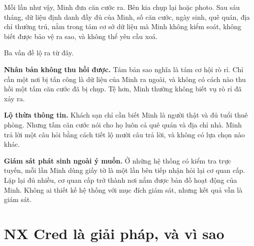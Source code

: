 \documentclass[a4paper,11pt,oneside]{report}
\theoremstyle{definition}
\theoremstyle{plain}
\begin{document}
Mỗi lần như vậy, Minh đưa căn cước ra. Bên kia chụp lại hoặc photo. Sau sáu tháng, dữ liệu định
danh đầy đủ của Minh, số căn cước, ngày sinh, quê quán, địa chỉ thường trú, nằm trong tám
cơ sở dữ liệu mà Minh không kiểm soát, không biết được bảo vệ ra sao, và không thể yêu cầu xoá.

\begin{center}
\end{center}

Ba vấn đề lộ ra từ đây.

\textbf{Nhân bản không thu hồi được.} Tám bản sao nghĩa là tám cơ hội rò rỉ. Chỉ cần một nơi bị
tấn công là dữ liệu của Minh ra ngoài, và không có cách nào thu hồi một tấm căn cước đã bị chụp.
Tệ hơn, Minh thường không biết vụ rò rỉ đã xảy ra.

\textbf{Lộ thừa thông tin.} Khách sạn chỉ cần biết Minh là người thật và đủ tuổi thuê phòng.
Nhưng tấm căn cước nói cho họ luôn cả quê quán và địa chỉ nhà. Minh trả lời một câu hỏi bằng cách
tiết lộ mười câu trả lời, và không có lựa chọn nào khác.

\textbf{Giám sát phát sinh ngoài ý muốn.} Ở những hệ thống có kiểm tra trực tuyến, mỗi lần Minh
dùng giấy tờ là một lần bên tiếp nhận hỏi lại cơ quan cấp. Lặp lại đủ nhiều, cơ quan cấp trở
thành nơi nắm được bản đồ hoạt động của Minh. Không ai thiết kế hệ thống với mục đích giám sát,
nhưng kết quả vẫn là giám sát.

\section{NX Cred là giải pháp, và vì sao}
\end{document}
